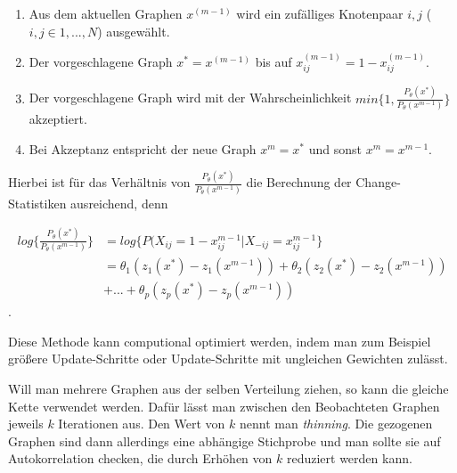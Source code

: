 \documentclass[a4paper,ngerman,oneside,titlepage,bibliography=totoc,11pt]{scrreprt}
\begin{document}
\begin{enumerate}
	\item Aus dem aktuellen Graphen $x^{(m-1)}$ wird ein zufälliges Knotenpaar $i,j$ ($i,j \in 1, ...,N$) ausgewählt.
	\item Der vorgeschlagene Graph $x^* = x^{(m-1)}$ bis auf $x_{ij}^{(m-1)} = 1 - x_{ij}^{(m-1)}$.
	\item Der vorgeschlagene Graph wird mit der Wahrscheinlichkeit $min\{1, \frac{P_{\theta}(x^*)}{P_{\theta}(x^{m-1})}\}$ akzeptiert.
	\item Bei Akzeptanz entspricht der neue Graph $x^m = x^*$ und sonst $x^m = x^{m-1}$.
\end{enumerate}

Hierbei ist für das Verhältnis von $\frac{P_{\theta}(x^*)}{P_{\theta}(x^{m-1})}$ die Berechnung der Change-Statistiken ausreichend, denn

\begin{align*}
log\{\frac{P_{\theta}(x^*)}{P_{\theta}(x^{m-1})}\} &= log\{P(X_{ij} = 1-x_{ij}^{m-1}|X_{-ij}=x_{ij}^{m-1}\} \\
																										&= \theta_1(z_1(x^*) - z_1(x^{m-1})) + \theta_2(z_2(x^*) - z_2(x^{m-1}))\\   																									& + ... + \theta_p(z_p(x^*) - z_p(x^{m-1}))
\end{align*}.

Diese Methode kann computional optimiert werden, indem man zum Beispiel größere Update-Schritte oder Update-Schritte mit ungleichen Gewichten zulässt.

Will man mehrere Graphen aus der selben Verteilung ziehen, so kann die gleiche Kette verwendet werden. Dafür lässt man zwischen den Beobachteten Graphen jeweils $k$ Iterationen aus. Den Wert von $k$ nennt man \emph{thinning}. Die gezogenen Graphen sind dann allerdings eine abhängige Stichprobe und man sollte sie auf Autokorrelation checken, die durch Erhöhen von $k$ reduziert werden kann.
\end{document}
